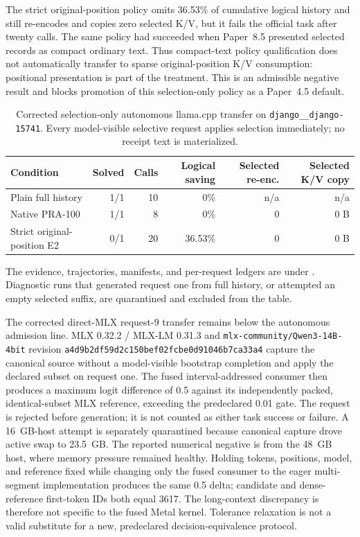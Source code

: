 \documentclass[11pt]{article}
\begin{document}
The strict original-position policy omits 36.53\% of cumulative logical
history and still re-encodes and copies zero selected K/V, but it fails the
official task after twenty calls.  The same policy had succeeded when Paper~8.5
presented selected records as compact ordinary text.  Thus compact-text policy
qualification does not automatically transfer to sparse original-position
K/V consumption: positional presentation is part of the treatment.  This is
an admissible negative result and blocks promotion of this selection-only
policy as a Paper~4.5 default.

\begin{table}[H]
\centering
\small
\caption{Corrected selection-only autonomous llama.cpp transfer on
\texttt{django\_\_django-15741}.  Every model-visible selective request applies
selection immediately; no receipt text is materialized.}
\begin{tabular}{lrrrrr}
\toprule
Condition & Solved & Calls & Logical saving & Selected re-enc. & Selected K/V copy \\
\midrule
Plain full history & 1/1 & 10 & 0\% & n/a & n/a \\
Native PRA-100 & 1/1 & 8 & 0\% & 0 & 0 B \\
Strict original-position E2 & 0/1 & 20 & 36.53\% & 0 & 0 B \\
\bottomrule
\end{tabular}
\label{tab:agent-selection-only-bootstrap-corrected}
\end{table}

The evidence, trajectories, manifests, and per-request ledgers are under
.  Diagnostic runs that generated
request one from full history, or attempted an empty selected suffix, are
quarantined and excluded from the table.

The corrected direct-MLX request-9 transfer remains below the autonomous
admission line.  MLX 0.32.2 / MLX-LM 0.31.3 and
\texttt{mlx-community/Qwen3-14B-4bit} revision
\texttt{a4d9b2df59d2c150bef02fcbe0d91046\allowbreak b7ca33a4} capture the canonical source
without a model-visible bootstrap completion and apply the declared subset on
request one.  The fused interval-addressed consumer then produces a maximum
logit difference of 0.5 against its independently packed, identical-subset
MLX reference, exceeding the predeclared 0.01 gate.  The request is rejected
before generation; it is not counted as either task success or failure.  A
16~GB-host attempt is separately quarantined because canonical capture drove
active swap to 23.5~GB.  The reported numerical negative is from the 48~GB
host, where memory pressure remained healthy.  Holding tokens, positions,
model, and reference fixed while changing only the fused consumer to the eager
multi-segment implementation produces the same 0.5 delta; candidate and
dense-reference first-token IDs both equal 3617.  The long-context discrepancy
is therefore not specific to the fused Metal kernel.  Tolerance relaxation is
not a valid substitute for a new, predeclared decision-equivalence protocol.
\end{document}
